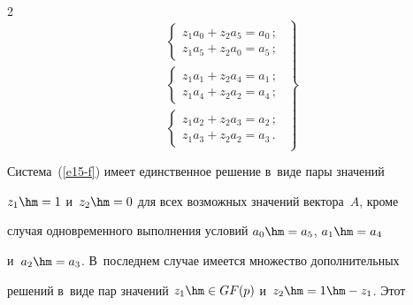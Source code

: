 \begin{multicols}{2}
\begin{equation}
  \left.


  \begin{array}{l}


  \left\{


  \begin{array}{c}


  z_1a_0+z_2a_5=a_0\,;\\[3pt]


  z_1a_5+z_2a_0=a_5\,;


  \end{array}


  \right.\\[12pt]


  \left\{


  \begin{array}{c}


  z_1a_1+z_2a_4=a_1\,;\\[3pt]


  z_1a_4+z_2a_2=a_4\,;


  \end{array}


  \right.\\[12pt]


  \left\{


  \begin{array}{c}


  z_1a_2+z_2a_3=a_2\,;\\[3pt]


  z_1a_3+z_2a_2=a_3\,.


  \end{array}


  \right.


  \end{array}


  \right\}


  \label{e15-f}


  \end{equation}


                  


  


  Система~(\ref{e15-f}) имеет единственное решение в~виде пары значений 


$z_1\hm=1$ и~$z_2\hm=0$ для всех возможных значений вектора~$A$, кроме 


случая одновременного выполнения условий $a_0\hm=a_5$, $a_1\hm= a_4$ 


и~$a_2\hm= a_3$. В~последнем случае имеется множество дополнительных 


решений в~виде пар значений $z_1\hm\in GF(p)$ и~$z_2\hm= 1\hm -z_1$. Этот 



\end{multicols}
